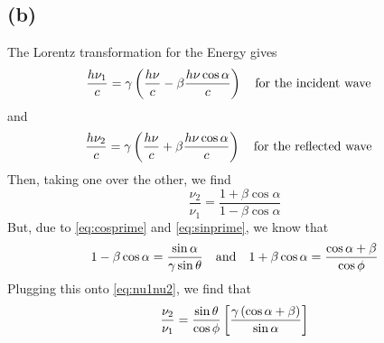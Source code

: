 \documentclass[oneside, 10pt, notitlepage]{book}
\begin{document}
\subsection*{(b)}

The Lorentz transformation for the Energy gives
\begin{equation}
    \frac{h\nu_1}{c} = \gamma \lr{\frac{h\nu}{c} - \beta \frac{h\nu \cos \alpha}{c}} \qq{for the incident wave}
\end{equation}
and
\begin{equation}
    \frac{h\nu_2}{c} = \gamma \lr{\frac{h\nu}{c} + \beta \frac{h\nu \cos \alpha}{c}} \qq{for the reflected wave}
\end{equation}
Then, taking one over the other, we find
\begin{equation}\label{eq:nu1nu2}
    \frac{\nu_2}{\nu_1} = \frac{1+\beta \cos \alpha}{1-\beta \cos \alpha}
\end{equation}
But, due to \eqref{eq:cosprime} and \eqref{eq:sinprime}, we know that
\begin{equation}
    1-\beta \cos \alpha = \frac{\sin \alpha}{\gamma \sin \theta} \qq{and} 1+\beta \cos \alpha = \frac{\cos \alpha + \beta}{\cos \phi}
\end{equation}
Plugging this onto \eqref{eq:nu1nu2}, we find that
\begin{equation}
    \frac{\nu_2}{\nu_1} = \frac{\sin \theta}{\cos \phi} \left[\frac{\gamma \left(\cos \alpha + \beta\right)}{\sin \alpha}\right]
\end{equation}



\end{document}
